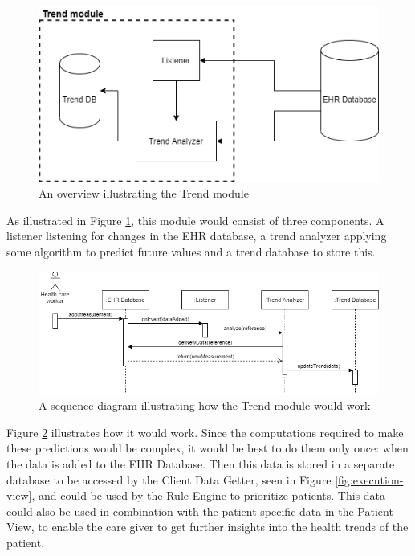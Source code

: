 \documentclass{article}
\begin{document}
\begin{figure}[h]
    \centering
    \includegraphics[scale = 0.45]{trend-module}
    \caption{An overview illustrating the Trend module}
    \label{fig:trend-module}
\end{figure}

As illustrated in Figure \ref{fig:trend-module}, this module would consist of three components. A listener listening for changes in the EHR database, a trend analyzer applying some algorithm to predict future values and a trend database to store this.

\begin{figure}[h]
    \centering
    \includegraphics[scale = 0.45]{trend-sequence}
    \caption{A sequence diagram illustrating how the Trend module would work}
    \label{fig:trend-sequence}
\end{figure}

Figure \ref{fig:trend-sequence} illustrates how it would work. Since the computations required to make these predictions would be complex, it would be best to do them only once: when the data is added to the EHR Database. Then this data is stored in a separate database to be accessed by the Client Data Getter, seen in Figure \ref{fig:execution-view}, and could be used by the Rule Engine to prioritize patients. This data could also be used in combination with the patient specific data in the Patient View, to enable the care giver to get further insights into the health trends of the patient.
\end{document}
